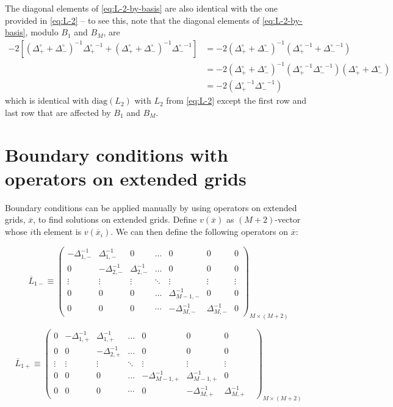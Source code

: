 \documentclass[11pt]{article}
\theoremstyle{definition}
\begin{document}
The diagonal elements of \eqref{eq:L-2-by-basis} are also identical with the one provided in \eqref{eq:L-2} -- to see this, note that the diagonal elements of \eqref{eq:L-2-by-basis}, modulo $B_1$ and $B_{M}$, are
\begin{align}
-2 \left[ ({\Delta_{+}^{\circ}} + {\Delta_{-}^{\circ}})^{-1} {\Delta_{+}^{\circ}}^{-1} + ({\Delta_{+}^{\circ}} + {\Delta_{-}^{\circ}})^{-1} {\Delta_{-}^{\circ}}^{-1} \right] &= -2 ({\Delta_{+}^{\circ}} + {\Delta_{-}^{\circ}})^{-1}  ( {\Delta_{+}^{\circ}}^{-1} + {\Delta_{-}^{\circ}}^{-1} ) \\
&= -2({\Delta_{+}^{\circ}} + {\Delta_{-}^{\circ}})^{-1} ({\Delta_{+}^{\circ}}^{-1} {\Delta_{-}^{\circ}}^{-1}) ({\Delta_{+}^{\circ}} + {\Delta_{-}^{\circ}} )  \\
&= -2 ({\Delta_{+}^{\circ}}^{-1} {\Delta_{-}^{\circ}}^{-1})
\end{align}
which is identical with $\text{diag} (L_2)$ with $L_2$ from \eqref{eq:L-2} except the first row and last row that are affected by $B_1$ and $B_{M}$.

\fi 

\section{Boundary conditions with operators on extended grids}
Boundary conditions can be applied manually by using operators on extended grids, $\overline{x}$, to find solutions on extended grids. Define $v(\overline{x})$ as $(M+2)$-vector whose $i$th element is $v(\overline {x}_i)$. We can then define the following operators on $\overline{x}$:


\begin{equation}\label{eq:L-1-minus-extended}
\overline{L}_{1-} \equiv\begin{pmatrix}
-\Delta_{1,-}^{-1}&\Delta_{1,-}^{-1}&0&\dots&0&0&0\\
0&-\Delta_{2,-}^{-1}&\Delta_{2,-}^{-1}&\dots&0&0&0\\
\vdots&\vdots&\vdots&\ddots&\vdots&\vdots&\vdots\\
0&0&0&\dots&\Delta_{M-1,-}^{-1}&0&0\\
0&0&0&\cdots&-\Delta_{M,-}^{-1}&\Delta_{M,-}^{-1}&0
\end{pmatrix}_{M\times (M+2)}
\end{equation}

\begin{equation}\label{eq:L-1-plus-extended}
\overline{L}_{1+} \equiv \begin{pmatrix}
0&-\Delta_{1,+}^{-1}&\Delta_{1,+}^{-1}&\dots&0&0&0\\
0&0&-\Delta_{2,+}^{-1}&\dots&0&0&0\\
\vdots&\vdots&\vdots&\ddots&\vdots&\vdots&\vdots\\
0&0&0&\dots&-\Delta_{M-1,+}^{-1}&\Delta_{M-1,+}^{-1}&0\\
0&0&0&\cdots&0&-\Delta_{M,+}^{-1}&\Delta_{M,+}^{-1}&
\end{pmatrix}_{M\times (M+2)}
\end{equation}
\end{document}
